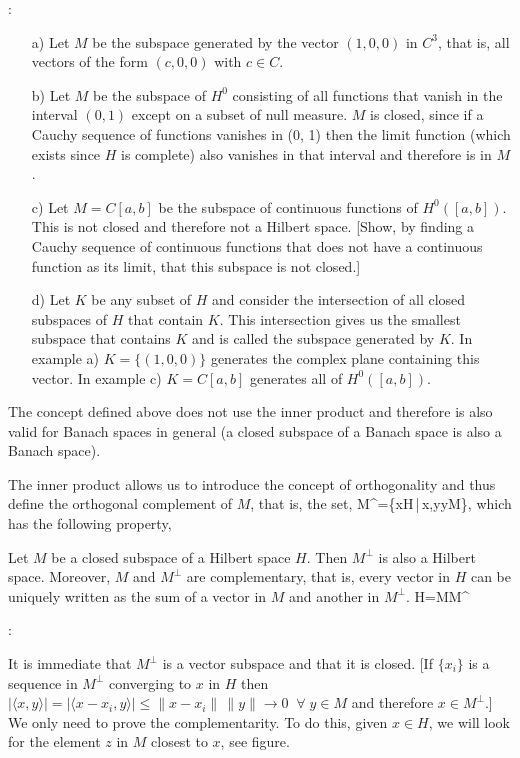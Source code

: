 \noi {}:
\begin{itemize}
\item[a)] 
Let $M$ be the subspace generated by the vector $(1, 0, 0)$ in $C^3$, that is, all vectors of the form $(c, 0, 0)$ with $c\in C$.

\item[b)] 
Let $M$ be the subspace of $H^0$ consisting of all functions that vanish in the interval $(0, 1)$ except on a subset of null measure. $M$ is closed, since if a Cauchy sequence of functions vanishes in (0, 1) then the limit function 
(which exists since $H$ is complete) also vanishes in that interval and therefore is in $M$.

\item[c)] 
Let $M=C[a,b]$ be the subspace of continuous functions of $H^0([a,b])$. This is not closed and therefore not a Hilbert space.
[Show, by finding a Cauchy sequence of continuous functions that does not have a continuous function as its limit, that this subspace is not closed.]

\item[d)] 
Let $K$ be any subset of $H$ and consider the intersection of all closed subspaces of $H$ that contain $K$. This intersection gives us the smallest subspace that contains $K$ and is called the subspace generated by $K$. 
In example a) $K=\{(1,0,0)\}$ generates the complex plane containing this vector.
In example c) $K=C[a,b]$
generates all of $H^0([a,b])$.

\end{itemize}

The concept defined above does not use the inner product and therefore is also valid for Banach spaces in general (a closed subspace of a Banach space is also a Banach space). 

The inner product allows us to introduce the concept of orthogonality and thus define the orthogonal complement of $M$, that is, the set,
\beq
M^{\perp}=\{x\in H\,|\,\langle x,y\;\forall\;y\in M\},
\eeq
which has the following property,

\bteo
 Let $M$ be a closed subspace of a Hilbert space $H$.
Then $M^{\perp}$ is also a Hilbert space. Moreover, $M$ and $M^{\perp}$ are complementary, that is, every vector in $H$ can be uniquely written as the sum of a vector in $M$ and another in $M^{\perp}$.
\beq
H=M\oplus M^{\perp}
\eeq
\eteo

\pru:

It is immediate that $M^{\perp}$ is a vector subspace and that it is closed.
[If $\{x_i\}$ is a sequence in $M^{\perp}$ converging to $x$ in $H$ then
$|\langle x,y\rangle|=|\langle x-x_i,y\rangle|\leq\|x-x_i\|\,\|y\|\to 0\;\;\forall \; y \in M$
 and therefore $x\in M^{\perp}$.]
We only need to prove the complementarity. To do this, given $x\in H$,
we will look for the element $z$ in $M$ closest to $x$, see figure.

